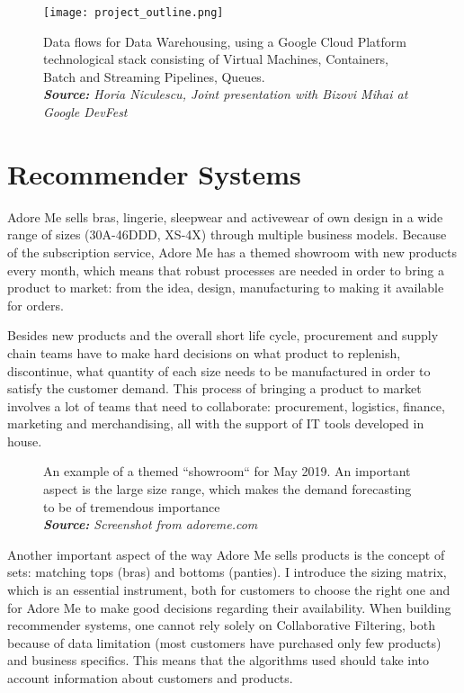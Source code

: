 \documentclass[12pt]{article}
\begin{document}
\begin{figure}[!ht]
	\flushleft
	\texttt{[image: project\_outline.png]}%
	\caption{Data flows for Data Warehousing, using a Google Cloud Platform technological stack consisting of Virtual Machines, Containers, Batch and Streaming Pipelines, Queues.  \\
		\textit{\textbf{Source:} Horia Niculescu, Joint presentation with Bizovi Mihai at Google DevFest}}
\end{figure}



\section{Recommender Systems}

Adore Me sells bras, lingerie, sleepwear and activewear of own design in a wide range of sizes (30A-46DDD, XS-4X) through multiple business models. Because of the subscription service, Adore Me has a themed showroom with new products every month, which means that robust processes are needed in order to bring a product to market: from the idea, design, manufacturing to making it available for orders. 

Besides new products and the overall short life cycle, procurement and supply chain teams have to make hard decisions on what product to replenish, discontinue, what quantity of each size needs to be manufactured in order to satisfy the customer demand. This process of bringing a product to market involves a lot of teams that need to collaborate: procurement, logistics, finance, marketing and merchandising, all with the support of IT tools developed in house. 




\begin{figure}[ht!]%
	\centering
	\qquad
	\caption{An example of a themed ``showroom`` for May 2019. An important aspect is the large size range, which makes the demand forecasting to be of tremendous importance \\
		\textit{\textbf{Source:} Screenshot from adoreme.com}}
	\label{fig:example}%
\end{figure}


Another important aspect of the way Adore Me sells products is the concept of sets: matching tops (bras) and bottoms (panties). I introduce the sizing matrix, which is an essential instrument, both for customers to choose the right one and for Adore Me to make good decisions regarding their availability. When building recommender systems, one cannot rely solely on Collaborative Filtering, both because of data limitation (most customers have purchased only few products) and business specifics. This means that the algorithms used should take into account information about customers and products.
\end{document}
